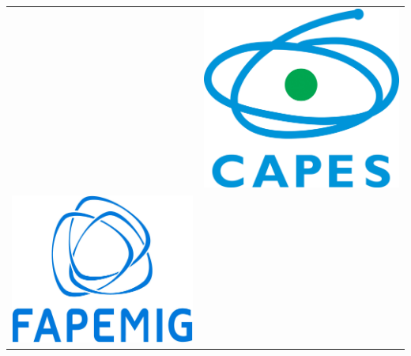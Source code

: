 \documentclass[xcolor=dvipsnames,10pt,aspectratio=169]{beamer}
\begin{document}
\begin{frame}
\begin{center}
\begin{tabular}{c c}
{			}&{
				\includegraphics[trim=0.0cm 0.0cm 0.0cm 0.0cm,clip=true,height=0.2\textheight]{figuras_presentation_template/CAPES.png}}\\
				{\includegraphics[trim=0.0cm 0.0cm 0.0cm 0.0cm,clip=true,height=0.2\textheight]{figuras_presentation_template/FAPEMIG.jpg}
			}&{
}
\end{tabular}
\end{center}
\end{frame}
\end{document}
